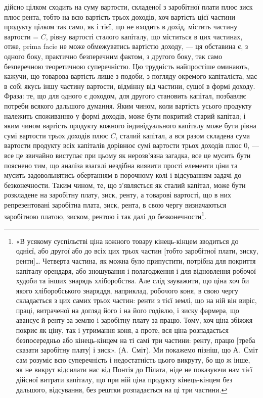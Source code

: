 \parcont{}  %
дійсно цілком сходить на суму вартости, складеної з заробітної плати плюс
зиск плюс рента, тобто на всю вартість трьох доходів, хоч вартість цієї частини
продукту цілком так само, як і тієї, що не входить в дохід, містить частину
вартости = $C$, рівну вартості сталого капіталу, що міститься в цих частинах,
отже, prima facie не може обмежуватись вартістю доходу, — ця обставина є, з одного
боку, практично безперечним фактом, з другого боку, так само безперечною
теоретичною суперечністю. Цю трудність найпростіше оминають, кажучи, що
товарова вартість лише з подоби, з погляду окремого капіталіста, має в собі
якусь іншу частину вартости, відмінну від частини, сущої в формі доходу.
Фраза: те, що для одного є доходом, для другого становить капітал, позбавляє
потреби всякого дальшого думання. Яким чином, коли вартість усього продукту
належить споживанню у формі доходів, може бути покритий старий капітал; і
яким чином вартість продукту кожного індивідуального капіталу може бути
рівна сумі вартости трьох доходів плюс $C$, сталий капітал, а вся разом складена
сума вартости продукту всіх капіталів дорівнює сумі вартости трьох доходів
плюс 0, — все це звичайно виступає при цьому як нерозв’язна загадка, все це
мусить бути пояснено тим, що аналіза взагалі нездібна виявити прості елементи
ціни та мусить задовольнятись обертанням в порочному колі і відсуванням
задачі до безконечности. Таким чином, те, що з’являється як сталий капітал,
може бути розкладене на заробітну плату, зиск, ренту, а товарові вартості,
що в них репрезентовані заробітна плата, зиск, рента, в свою чергу визначаються
заробітною платою, зиском, рентою і так далі до безконечности\footnote{
«В усякому суспільстві ціна кожного товару кінець-кінцем зводиться до однієї, або другої або до
всіх цих трьох частин [тобто заробітної плати, зиску, ренти]\dots{} Четверта частина, як можна було
припустити, потрібна для покриття капіталу орендаря, або зношування і полагодження і для відновлення
робочої худоби та інших знарядь хліборобства. Але слід зауважити, що ціна хоч би якого
хліборобського знаряддя, наприклад, робочого коня, в свою чергу складається з цих самих трьох
частин: ренти
з тієї землі, що на ній він виріс, праці, витраченої на догляд його і на його годівлю, і зиску
фармера, що авансує й ренту за землю і заробітну плату за працю. Тому, хоч ціна збіжжя покриє як
ціну, так і утримання коня, а проте, вся ціна розпадається безпосередньо або кінець-кінцем на ті
самі три частини: ренту, працю [треба сказати заробітну плату] і зиск». (А.~Сміт). Ми покажемо
пізніш, що А.~Сміт сам розуміє всю суперечність і недостатність цього викруту, бо що ж інше, як не
викрут відсилати
нас від Понтія до Пілата, ніде не показуючи нам тієї дійсної витрати капіталу, що при ній ціна
продукту кінець-кінцем без дальшого, відсування, без рештки розпадається на ці три частини.
}.

